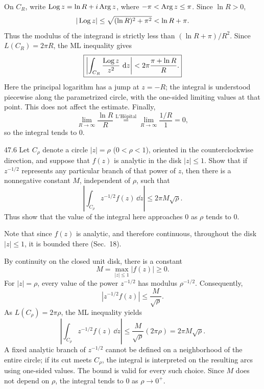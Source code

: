 \documentclass[11pt,oneside]{article}
\begin{document}
\begin{solution}
On $C_R$, write $\operatorname{Log} z=\ln R+i\operatorname{Arg} z$, where $-\pi<\operatorname{Arg} z\le\pi$. Since $\ln R>0$,
\[
    |\operatorname{Log} z|\le\sqrt{(\ln R)^2+\pi^2}<\ln R+\pi.
\]
Thus the modulus of the integrand is strictly less than $(\ln R+\pi)/R^2$. Since $L(C_R)=2\pi R$, the ML inequality gives
\[
    \boxed{\left|\int_{C_R}\frac{\operatorname{Log} z}{z^2}\,\mathop{}\!\mathrm{d} z\right|
      <2\pi\frac{\pi+\ln R}{R}.}
\]
Here the principal logarithm has a jump at $z=-R$; the integral is understood piecewise along the parametrized circle, with the one-sided limiting values at that point. This does not affect the estimate. Finally,
\[
    \lim_{R\to\infty}\frac{\ln R}{R}
    \overset{\mathrm{L'H\hat{o}pital}}{=}
    \lim_{R\to\infty}\frac{1/R}{1}=0,
\]
so the integral tends to $0$.
\end{solution}

\begin{exercise}{47.6}
Let $C_\rho$ denote a circle $|z|=\rho$ ($0<\rho<1$), oriented in the counterclockwise direction, and suppose that $f(z)$ is analytic in the disk $|z|\le1$. Show that if $z^{-1/2}$ represents any particular branch of that power of $z$, then there is a nonnegative constant $M$, independent of $\rho$, such that
\[
    \left|\int_{C_\rho}z^{-1/2}f(z)\,\dd z\right|\le 2\pi M\sqrt\rho.
\]
Thus show that the value of the integral here approaches $0$ as $\rho$ tends to $0$.
\begin{suggestion}
Note that since $f(z)$ is analytic, and therefore continuous, throughout the disk $|z|\le1$, it is bounded there (Sec.~18).
\end{suggestion}
\end{exercise}

\begin{solution}
By continuity on the closed unit disk, there is a constant
\[
    M=\max_{|z|\le1}|f(z)|\ge0.
\]
For $|z|=\rho$, every value of the power $z^{-1/2}$ has modulus $\rho^{-1/2}$. Consequently,
\[
    |z^{-1/2}f(z)|\le\frac{M}{\sqrt\rho}.
\]
As $L(C_\rho)=2\pi\rho$, the ML inequality yields
\[
    \boxed{\left|\int_{C_\rho}z^{-1/2}f(z)\,\dd z\right|
      \le\frac{M}{\sqrt\rho}(2\pi\rho)=2\pi M\sqrt\rho.}
\]
A fixed analytic branch of $z^{-1/2}$ cannot be defined on a neighborhood of the entire circle; if its cut meets $C_\rho$, the integral is interpreted on the resulting arcs using one-sided values. The bound is valid for every such choice. Since $M$ does not depend on $\rho$, the integral tends to $0$ as $\rho\to0^+$.
\end{solution}
\end{document}
